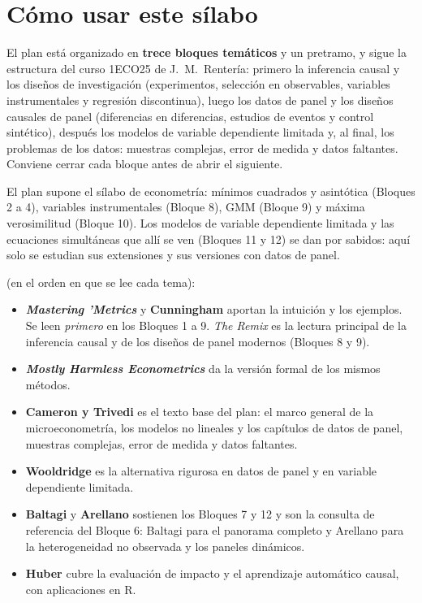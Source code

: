 \documentclass[11pt,a4paper]{article}
\newcommand{\destacado}[1]{{\sffamily\bfseries\color{tonoPrincipal}#1}}
\begin{document}
\tableofcontents
\newpage

\section*{Cómo usar este sílabo}

El plan está organizado en \textbf{trece bloques temáticos} y un pretramo, y
sigue la estructura del curso 1ECO25 de J.~M.~Rentería: primero la inferencia
causal y los diseños de investigación (experimentos, selección en observables,
variables instrumentales y regresión discontinua), luego los datos de panel y
los diseños causales de panel (diferencias en diferencias, estudios de eventos
y control sintético), después los modelos de variable dependiente limitada y,
al final, los problemas de los datos: muestras complejas, error de medida y
datos faltantes. Conviene cerrar cada bloque antes de abrir el siguiente.

\medskip
\noindent\destacado{Requisito.} El plan supone el sílabo de econometría:
mínimos cuadrados y asintótica (Bloques 2 a 4), variables instrumentales
(Bloque 8), GMM (Bloque 9) y máxima verosimilitud (Bloque 10). Los modelos de
variable dependiente limitada y las ecuaciones simultáneas que allí se ven
(Bloques 11 y 12) se dan por sabidos: aquí solo se estudian sus extensiones y
sus versiones con datos de panel.

\medskip
\noindent\destacado{Criterio general de reparto} (en el orden en que se lee cada tema):
\begin{itemize}[leftmargin=1.4em,itemsep=2pt]
  \item \textcolor{colorMM}{\textbf{\emph{Mastering 'Metrics}}} y
        \textcolor{colorCI}{\textbf{Cunningham}} aportan la intuición y los
        ejemplos. Se leen \emph{primero} en los Bloques 1 a 9. \emph{The
        Remix} es la lectura principal de la inferencia causal y de los
        diseños de panel modernos (Bloques 8 y 9).
  \item \textcolor{colorMHE}{\textbf{\emph{Mostly Harmless Econometrics}}}
        da la versión formal de los mismos métodos.
  \item \textcolor{colorCT}{\textbf{Cameron y Trivedi}} es el texto base del
        plan: el marco general de la microeconometría, los modelos no lineales
        y los capítulos de datos de panel, muestras complejas, error de medida
        y datos faltantes.
  \item \textcolor{colorWd}{\textbf{Wooldridge}} es la alternativa rigurosa
        en datos de panel y en variable dependiente limitada.
  \item \textcolor{colorBt}{\textbf{Baltagi}} y
        \textcolor{colorAr}{\textbf{Arellano}} sostienen los Bloques 7 y 12
        y son la consulta de referencia del Bloque 6: Baltagi para el
        panorama completo y Arellano para la heterogeneidad no observada y
        los paneles dinámicos.
  \item \textcolor{colorHu}{\textbf{Huber}} cubre la evaluación de impacto y
        el aprendizaje automático causal, con aplicaciones en R.
\end{itemize}
\end{document}
